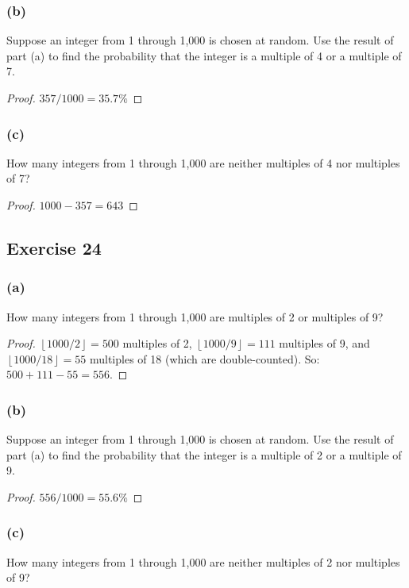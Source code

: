 \documentclass[14pt]{extarticle}
\newcommand{\floor}[1]{{\left\lfloor#1\right\rfloor}}
\begin{document}
\subsubsection{(b)}
Suppose an integer from 1 through 1,000 is chosen at random. Use the result of part (a) to find the probability that the integer is a multiple of 4 or a multiple of 7.

\begin{proof}
     \(357/1000 = 35.7\%\)
\end{proof}

\subsubsection{(c)}
How many integers from 1 through 1,000 are neither multiples of 4 nor multiples of 7?

\begin{proof}
     \(1000-357 = 643\)
\end{proof}

\subsection{Exercise 24}
\subsubsection{(a)}
How many integers from 1 through 1,000 are multiples of 2 or multiples of 9?

\begin{proof}
     \(\floor{1000 / 2} = 500\) multiples of 2, \(\floor{1000 / 9} = 111\) multiples of 9, and \(\floor{1000 / 18} = 55\)
     multiples of 18 (which are double-counted). So: \(500 + 111 - 55 = 556\).
\end{proof}

\subsubsection{(b)}
Suppose an integer from 1 through 1,000 is chosen at random. Use the result of part (a) to find the probability that the integer is a multiple of 2 or a multiple of 9.

\begin{proof}
     \(556/1000=55.6\%\)
\end{proof}

\subsubsection{(c)}
How many integers from 1 through 1,000 are neither multiples of 2 nor multiples of 9?
\end{document}
